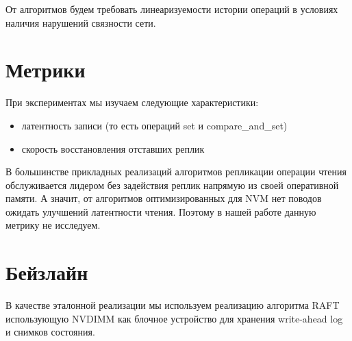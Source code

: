 \documentclass[pdftex,ptm,12pt,a4paper]{report}
\theoremstyle{definition}
\begin{document}
От алгоритмов будем требовать линеаризуемости \cite{linearizability} истории операций в условиях наличия нарушений связности сети.

\section{Метрики}
При экспериментах мы изучаем следующие характеристики:
\begin{itemize}
    \item латентность записи (то есть операций set и compare\_and\_set)
    \item скорость восстановления отставших реплик
\end{itemize}

В большинстве прикладных реализаций алгоритмов репликации операции чтения обслуживается лидером без задействия реплик напрямую из своей оперативной памяти.
А значит, от алгоритмов оптимизированных для NVM нет поводов ожидать улучшений латентности чтения. Поэтому в нашей работе данную метрику не исследуем.

\section{Бейзлайн}
В качестве эталонной реализации мы используем реализацию алгоритма RAFT \cite{raftpaper} использующую NVDIMM как блочное устройство
для хранения write-ahead log и снимков состояния.
\end{document}
